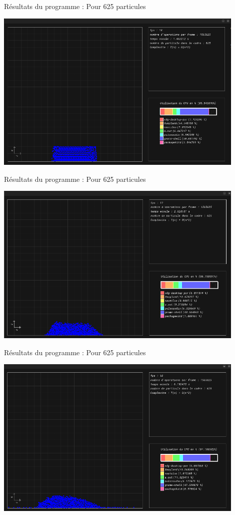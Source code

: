 \documentclass{article}
\begin{document}
\newpage
\vspace*{2pt}
\thispagestyle{landscape}
Résultats du programme : Pour 625 particules 
\begin{center}
    \includegraphics[width=0.9\textwidth]{R_Frame3.png}
\end{center}

\newpage
\vspace*{2pt}
\thispagestyle{landscape}
Résultats du programme : Pour 625 particules 
\begin{center}
    \includegraphics[width=0.9\textwidth]{R_Frame4.png}
\end{center}

\newpage
\vspace*{2pt}
\thispagestyle{landscape}
Résultats du programme : Pour 625 particules 
\begin{center}
    \includegraphics[width=0.9\textwidth]{R_Frame5.png}
\end{center}
\end{document}
